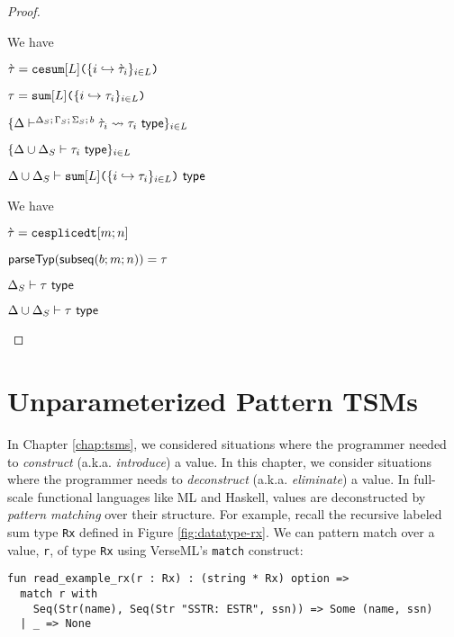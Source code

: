 \begin{proof}
\begin{byCases}
\item[\text{(\ref{rule:cvalidT-U-sum})}] We have
\begin{pfsteps*}
\item $\grave{\tau}=\texttt{cesum}[L]\texttt{(}\{i \hookrightarrow \grave{\tau}_{i}\}_{i \in L}\texttt{)}$   
\item $\tau=\texttt{sum}[L]\texttt{(}\{i \hookrightarrow \tau_{i}\}_{i \in L}\texttt{)}$ 
\item $\{\Delta\vdash^{\Delta_S;\,\Gamma_S;\,\Sigma_S;\,b} \grave{\tau}_i \leadsto \tau_i~\mathsf{type}\}_{i \in L}$  
\item $\{{\Delta}\cup{\Delta_S} \vdash \tau_i~\mathsf{type}\}_{i \in L}$  
\item ${\Delta}\cup{\Delta_S} \vdash \texttt{sum}[L]\texttt{(}\{i \hookrightarrow \tau_{i}\}_{i \in L}\texttt{)}~\mathsf{type}$ 
\end{pfsteps*}
\resetpfcounter

\item[\text{(\ref{rule:cvalidT-U-splicedt})}] We have
\begin{pfsteps*}
\item $\grave{\tau}=\texttt{cesplicedt}[m; n]$ 
\item $\mathsf{parseTyp}(\mathsf{subseq}(b; m; n))=\tau$ 
\item $\Delta_S \vdash \tau~\mathsf{type}$ 
\item ${\Delta}\cup{\Delta_S} \vdash \tau~\mathsf{type}$ 
\end{pfsteps*}
\resetpfcounter
\end{byCases}
\end{proof}

\chapter{Unparameterized Pattern TSMs}\label{sec:pattern-tsms}
In Chapter \ref{chap:tsms}, we considered situations where the programmer needed to \emph{construct} (a.k.a. \emph{introduce}) a value. In this chapter, we consider situations where the programmer needs to \emph{deconstruct} (a.k.a. \emph{eliminate}) a value. In full-scale functional languages like ML and Haskell, values are deconstructed by \emph{pattern matching} over their structure. For example, recall the recursive labeled sum type \lstinline{Rx} defined in Figure \ref{fig:datatype-rx}. We can pattern match over a value, \lstinline{r}, of type \lstinline{Rx} using VerseML's \lstinline{match} construct:
\begin{lstlisting}
fun read_example_rx(r : Rx) : (string * Rx) option => 
  match r with 
    Seq(Str(name), Seq(Str "SSTR: ESTR", ssn)) => Some (name, ssn)
  | _ => None
\end{lstlisting}

